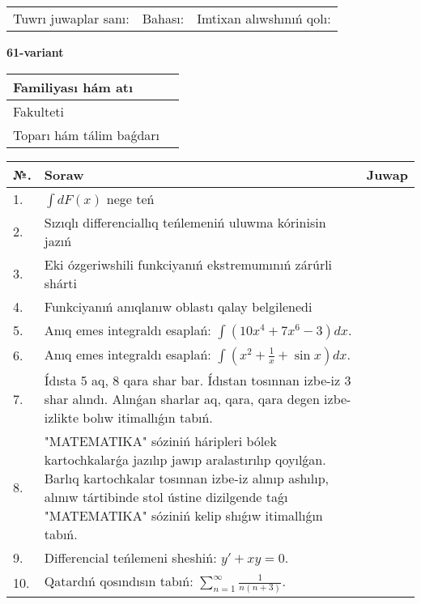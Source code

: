 \documentclass{article}
\begin{document}
\vspace{1cm}

\begin{tabular}{ c c c }
Tuwrı juwaplar sanı: \underline{\hspace{2cm}} & Bahası: \underline{\hspace{2cm}} & Imtixan alıwshınıń qolı: \underline{\hspace{2cm}} \\
\end{tabular}

\newpage

\begin{center}\textbf{61-variant}\end{center}

\bgroup
\def\arraystretch{1.5}
\begin{tabular}{ |m{6cm}|m{10cm}| }
  \hline
  Familiyası hám atı & \\
  \hline
  Fakulteti &\\
  \hline
  Toparı hám tálim baǵdarı & \\
  \hline
\end{tabular}
\egroup

\vspace{0.5cm}

\bgroup
\def\arraystretch{2}
\begin{tabular}{ |l|m{8cm}|m{7cm}| }
  \hline
  №. & Soraw & Juwap \\
  \hline
  1. & $\displaystyle\int dF(x)$ nege teń &  \\
  \hline
  2. & Sızıqlı differenciallıq teńlemeniń uluwma kórinisin jazıń &  \\
  \hline
  3. & Eki ózgeriwshili funkciyanıń ekstremumınıń zárúrli shárti &  \\
  \hline
  4. & Funkciyanıń anıqlanıw oblastı qalay belgilenedi &  \\
  \hline
  5. & Anıq emes integraldı esaplań: $\displaystyle\int \left( 10x^{4} + 7x^{6} - 3 \right)dx$. &  \\
  \hline
  6. & Anıq emes integraldı esaplań: $\displaystyle\int(x^{2}+\frac{1}{x} + \sin x)dx$. &  \\
  \hline
  7. & Ídısta 5 aq, 8 qara shar bar. Ídıstan tosınnan izbe-iz 3 shar alındı. Alınǵan sharlar aq, qara, qara degen izbe-izlikte bolıw itimallıǵın tabıń. &  \\
  \hline
  8. & "MATEMATIKA" sóziniń háripleri bólek kartochkalarǵa jazılıp jawıp aralastırılıp qoyılǵan. Barlıq kartochkalar tosınnan izbe-iz alınıp ashılıp, alınıw tártibinde stol ústine dizilgende taǵı "MATEMATIKA" sóziniń kelip shıǵıw itimallıǵın tabıń. &  \\
  \hline
  9. & Differencial teńlemeni sheshiń: $y' + xy = 0$. &  \\
  \hline
  10. & Qatardıń qosındısın tabıń: $\displaystyle\sum_{n = 1}^{\infty}\frac{1}{n(n + 3)}$. &  \\
  \hline
\end{tabular}
\egroup
\end{document}
